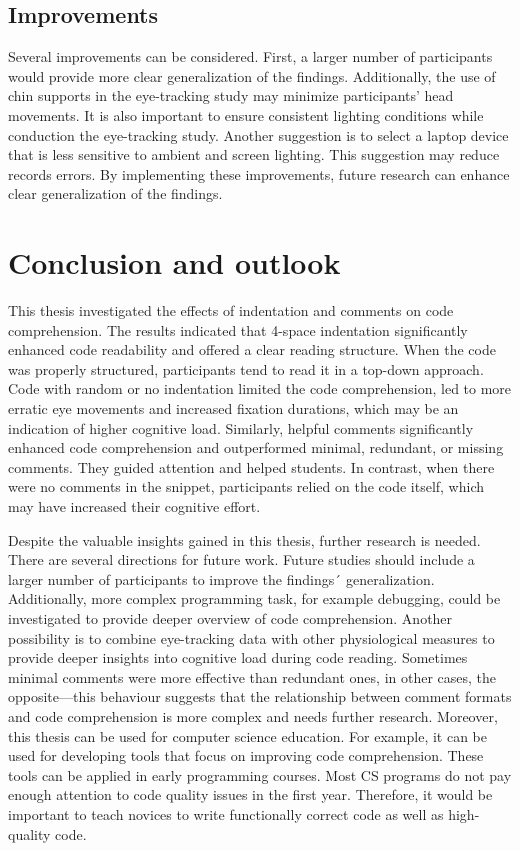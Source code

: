 \section{Improvements}

Several improvements can be considered. First, a larger number of participants would provide more clear generalization of the findings. Additionally, the use of chin supports in the eye-tracking study may minimize participants’ head movements. It is also important to ensure consistent lighting conditions while conduction the eye-tracking study. Another suggestion is to select a laptop device that is less sensitive to ambient and screen lighting. This suggestion may reduce records errors. By implementing these improvements, future research can enhance clear generalization of the findings. 





\chapter{Conclusion and outlook}
\label{sec:conclusion}

This thesis investigated the effects of indentation and comments on code comprehension. The results indicated that 4-space indentation significantly enhanced code readability and offered a clear reading structure. When the code was properly structured, participants tend to read it in a top-down approach. Code with random or no indentation limited the code comprehension, led to more erratic eye movements and increased fixation durations, which may be an indication of higher cognitive load.  Similarly, helpful comments significantly enhanced code comprehension and outperformed minimal, redundant, or missing comments.  They guided attention and helped students. In contrast, when there were no comments in the snippet, participants relied on the code itself, which may have increased their cognitive effort.
 
Despite the valuable insights gained in this thesis, further research is needed. There are several directions for future work.  Future studies should include a larger number of participants to improve the findings´ generalization. Additionally, more complex programming task, for example debugging, could be investigated to provide deeper overview of code comprehension. Another possibility is to combine eye-tracking data with other physiological measures to provide deeper insights into cognitive load during code reading. Sometimes minimal comments were more effective than redundant ones, in other cases, the opposite—this behaviour suggests that the relationship between comment formats and code comprehension is more complex and needs further research.  Moreover, this thesis can be used for computer science education. For example, it can be used for developing tools that focus on improving code comprehension. These tools can be applied in early programming courses. Most CS programs do not pay enough attention to code quality issues in the first year. Therefore, it would be important to teach novices to write functionally correct code as well as high-quality code.   


